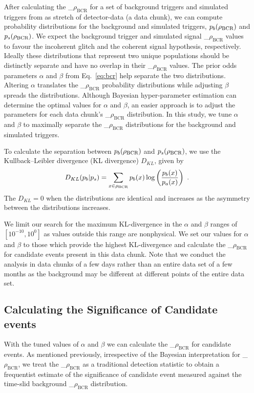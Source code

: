 \documentclass[%
 nofootinbib,
 amsmath,amssymb,
 aps,
 twocolumn
]{revtex4-2}
\newcommand{\mathcmd}[1]{{\sc \relax\ifmmode#1\else $#1$\fi}\xspace}
\newcommand{\bcr}{\mathcmd{\rho_\text{BCR}}}
\begin{document}
After calculating the \bcr for a set of background triggers and simulated triggers from as stretch of detector-data (a data chunk), we can compute probability distributions for the background and simulated triggers, $p_b(\bcr)$ and $p_s(\bcr)$. We expect the background trigger and simulated signal \bcr values to favour the incoherent glitch and the coherent signal hypothesis, respectively. Ideally these distributions that represent two unique populations should be distinctly separate and have no overlap in their \bcr values. The prior odds parameters $\alpha$ and $\beta$ from Eq.~\ref{eq:bcr} help separate the two distributions. Altering $\alpha$ translates the \bcr probability distributions while adjusting $\beta$ spreads the distributions. Although Bayesian hyper-parameter estimation can determine the optimal values for $\alpha$ and $\beta$, an easier approach is to adjust the parameters for each data chunk's \bcr distribution. In this study, we tune $\alpha$ and $\beta$ to maximally separate the \bcr distributions for the background and simulated triggers. 

To calculate the separation between $p_b(\bcr)$ and $p_s(\bcr)$, we use the Kullback--Leibler divergence (KL divergence) $D_{KL}$, given by
\begin{equation}
    D_{KL}(p_b | p_s) = \sum\limits_{x\in \bcr} p_b(x) \log \left( \frac{p_b(x)}{p_a(x)} \right)  \ .
\end{equation}
The $D_{KL}=0$ when the distributions are identical and increases as the asymmetry between the distributions increases. 

We limit our search for the maximum KL-divergence in the $\alpha$ and $\beta$ ranges of $[10^{-10}, 10^0]$ as values outside this range are nonphysical. We set our values for $\alpha$ and $\beta$ to those which provide the highest KL-divergence and calculate the \bcr for candidate events present in this data chunk. Note that we conduct the analysis in data chunks of a few days rather than an entire data set of a few months as the background may be different at different points of the entire data set.

\subsection{Calculating the Significance of Candidate events}
With the tuned values of $\alpha$ and $\beta$ we can calculate the \bcr for candidate events. As mentioned previously, irrespective of the Bayesian interpretation for \bcr, we treat the \bcr as a traditional detection statistic to obtain a frequentist estimate of the significance of candidate event measured against the time-slid background \bcr distribution. 
\end{document}
